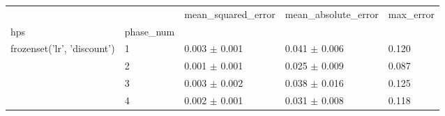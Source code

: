 \begin{tabular}{lllll}
\toprule
 &  & mean_squared_error & mean_absolute_error & max_error \\
hps & phase_num &  &  &  \\
\midrule
\multirow[t]{4}{*}{frozenset({'lr', 'discount'})} & 1 & 0.003 $\pm$ 0.001 & 0.041 $\pm$ 0.006 & 0.120 \\
 & 2 & 0.001 $\pm$ 0.001 & 0.025 $\pm$ 0.009 & 0.087 \\
 & 3 & 0.003 $\pm$ 0.002 & 0.038 $\pm$ 0.016 & 0.125 \\
 & 4 & 0.002 $\pm$ 0.001 & 0.031 $\pm$ 0.008 & 0.118 \\
\cline{1-5}
\bottomrule
\end{tabular}
